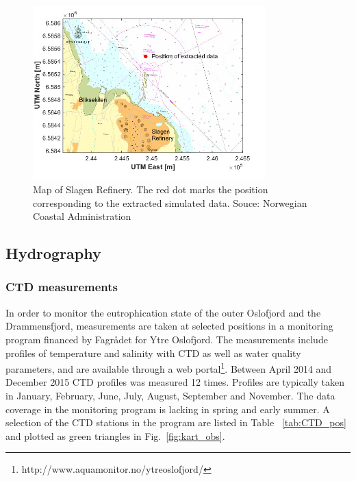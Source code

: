 \begin{figure}[htb]
\centerline{
\includegraphics*[trim=0cm 0cm 1cm 0cm,clip=true,width=0.8\textwidth]{Figurer/Slagen_kart}}
\caption{\small
Map of Slagen Refinery. The red dot marks the position corresponding to the extracted simulated data. Souce: Norwegian Coastal Administration}
\label{fig:Slagen-kart}
\end{figure}

\clearpage
\subsection{Hydrography}

\subsubsection{CTD measurements}


In order to monitor the eutrophication state of the outer Oslofjord and the Drammensfjord, measurements are taken at selected positions in a monitoring program financed by Fagr{\aa}det for Ytre Oslofjord. 
The measurements include profiles of temperature and salinity with CTD as well as water quality parameters, 
and are available through a web portal\footnote{http://www.aquamonitor.no/ytreoslofjord/}. 
Between April 2014 and December 2015 CTD profiles was measured 12 times. 
Profiles are typically taken in January, February, June, July, August, September and November. 
The data coverage in the monitoring program is lacking in spring and early summer. 
A selection of the CTD stations in the program are listed in Table ~\ref{tab:CTD_pos} and plotted as green triangles in Fig.~\ref{fig:kart_obs}. 

